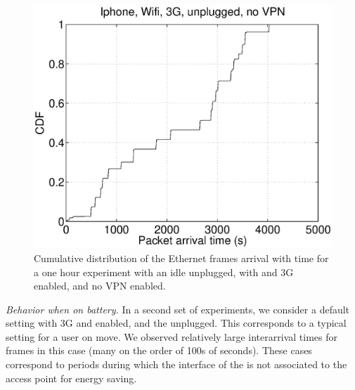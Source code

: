 

\begin{figure}
\centering
        \includegraphics[width=0.8\linewidth]{../../code/pushNotification/Fig/bw_iphone_wifi_3g_unplug_novpn_ts.eps}
  \caption{Cumulative distribution of the Ethernet frames
          arrival with time for a one hour experiment with an idle
          \iphone{} unplugged, with \wifi{} and 3G enabled, and no VPN
          enabled.}
  \label{fig:push_w3_ts}
\end{figure}

\emph{Behavior when on battery.} 
In a second set of experiments, we consider a default \iphone{}
setting with 3G and \wifi{} enabled, and the \iphone{} unplugged. This
corresponds to a typical setting for a user on move.  We observed 
relatively large interarrival times for frames in this case (many on the order of 100s of 
seconds). These cases correspond to
periods during which the \wifi interface of the \iphone{} is not
associated to the access point for energy saving. 




